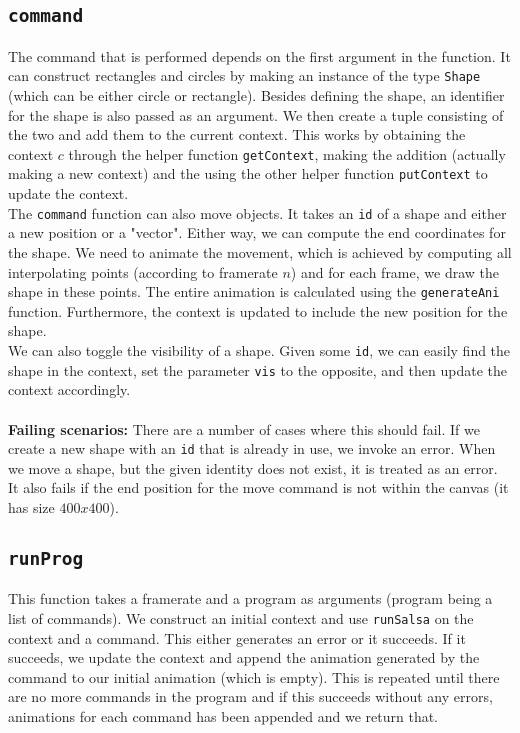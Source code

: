 \documentclass[a4paper]{article}
\begin{document}
\subsection*{\texttt{command}}
The command that is performed depends on the first argument in the function. It can construct rectangles and circles by making an instance of the type \texttt{Shape} (which can be either circle or rectangle). Besides defining the shape, an identifier for the shape is also passed as an argument. We then create a tuple consisting of the two and add them to the current context. This works by obtaining the context $c$ through the helper function \texttt{getContext}, making the addition (actually making a new context) and the using the other helper function \texttt{putContext} to update the context. \\
The \texttt{command} function can also move objects. It takes an \texttt{id} of a shape and either a new position or a "vector". Either way, we can compute the end coordinates for the shape. We need to animate the movement, which is achieved by computing all interpolating points (according to framerate $n$) and for each frame, we draw the shape in these points. The entire animation is calculated using the \texttt{generateAni} function. Furthermore, the context is updated to include the new position for the shape. \\
We can also toggle the visibility of a shape. Given some \texttt{id}, we can easily find the shape in the context, set the parameter \texttt{vis} to the opposite, and then update the context accordingly.\\
\\
\textbf{Failing scenarios:}
There are a number of cases where this should fail. If we create a new shape with an \texttt{id} that is already in use, we invoke an error. When we move a shape, but the given identity does not exist, it is treated as an error. It also fails if the end position for the move command is not within the canvas (it has size $400x400$).

\subsection*{\texttt{runProg}}
This function takes a framerate and a program as arguments (program being a list of commands). We construct an initial context and use \texttt{runSalsa} on the context and a command. This either generates an error or it succeeds. If it succeeds, we update the context and append the animation generated by the command to our initial animation (which is empty). This is repeated until there are no more commands in the program and if this succeeds without any errors, animations for each command has been appended and we return that.
\end{document}
